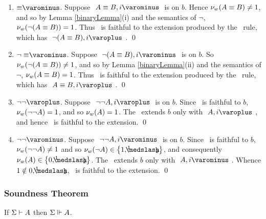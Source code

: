 \begin{proof*}
\begin{enumerate}
		\item $\uRule{ \equiv }$. 	Suppose $ \like{ \uNode{ A \equiv B }{ i } } $ is on $ b $.
								Hence $ \mathcal{\nu}_{ w }({ A \equiv B }) \neq 1 $, and so by Lemma \ref{binaryLemma}(i) and the semantics of $\neg$, 
								$ \mathcal{\nu}_{ w }({ \neg (A \equiv B) }) = 1 $. Thus \Model\ is faithful to the extension produced by the \uRule{ \equiv }\ rule,
								which has $ \like{ \dNodei{ \neg (A \equiv B )}} $.
								\qed

		\item $\uRule{ \neg\equiv }$. Suppose $ \like{ \uNode{ \neg (A \equiv B) }{ i } } $ is on $ b $.
								So $ \mathcal{\nu}_{ w }({ \neg (A \equiv B )}) \neq 1 $, and so by Lemma \ref{binaryLemma}(ii) and the semantics of $\neg$,
								$ \mathcal{\nu}_{ w }({ A \equiv B }) = 1 $. Thus \Model\ is faithful to the extension produced by the \uRule{ \neg \equiv }\ rule,
								which has $ \like{ \dNodei{ A \equiv B }} $.
								\qed

		\item $\dRule{ \neg\neg }$. 	Suppose $ \like{ \dNode{ \neg\neg A }{ i } } $ is on $ b $.
								Since \Model\ is faithful to $b$, $ \mathcal{\nu}_{ w }({ \neg \neg A }) = 1 $, and so $ \mathcal{\nu}_{ w }({ A }) = 1 $. 
								The \dRule{ \neg\neg }\ extends $b$ only with $\like{\dNodei{A}} $, and hence \Model\ is faithful to the extension.
								\qed

		\item $\uRule{ \neg\neg }$. Suppose $ \like{ \uNode{ \neg\neg A }{ i } } $ is on $ b $.
								Since \Model\ is faithful to $b$, $ \mathcal{\nu}_{ w }({ \neg \neg A }) \neq 1 $ and so $ \Valww{ \neg A } \in \set{ 1, \oneHalf } $, 
								and consequently $ \Valww{ A } \in \set{ 0, \oneHalf } $. 
								The \uRule{\neg\neg}\ extends $b$ only with $\like{\uNodei{A}} $.
								Whence $ 1 \notin { 0, \oneHalf } $, \Model\ is faithful to the extension.
								\qed

	\end{enumerate}
\end{proof*}

\subsubsection{Soundness Theorem}

\begin{thm}\label{soundnessTheorem}
If $ { \Sigma }\vdash{ A } $ then $ { \Sigma }\Vdash{ A } $.
\end{thm}


